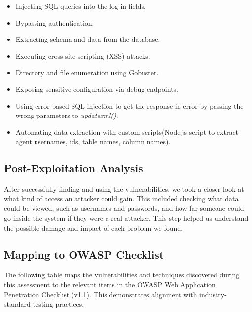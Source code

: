 \documentclass[12pt]{article}
\begin{document}
\begin{itemize}
  \item Injecting SQL queries into the log-in fields.
  \item Bypassing authentication.
  \item Extracting schema and data from the database.
  \item Executing cross-site scripting (XSS) attacks.
  \item Directory and file enumeration using Gobuster.
  \item Exposing sensitive configuration via debug endpoints.
  \item Using error-based SQL injection to get the response in error by passing the wrong parameters to \textit{updatexml()}.
  \item Automating data extraction with custom scripts(Node.js script to extract agent usernames, ids, table names, column names).
\end{itemize}

\subsection{Post-Exploitation Analysis}
After successfully finding and using the vulnerabilities, we took a closer look at what kind of access an attacker could gain. This included checking what data could be viewed, such as usernames and passwords, and how far someone could go inside the system if they were a real attacker. This step helped us understand the possible damage and impact of each problem we found.

\subsection{Mapping to OWASP Checklist}

The following table maps the vulnerabilities and techniques discovered during this assessment to the relevant items in the OWASP Web Application Penetration Checklist (v1.1)\cite{owasp-checklist}. This demonstrates alignment with industry-standard testing practices.
\end{document}
